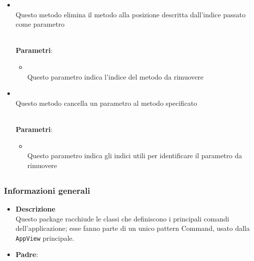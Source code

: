 \begin{itemize}
\begin{itemize}
\begin{itemize}
\end{itemize}
\item {}
\\ Questo metodo elimina il metodo alla posizione descritta dall'indice passato come parametro

\\ \textbf{Parametri}:
\begin{itemize}
\item {}
\\ Questo parametro indica l'indice del metodo da rimuovere

\end{itemize}
\item {}
\\ Questo metodo cancella un parametro al metodo specificato

\\ \textbf{Parametri}:
\begin{itemize}
\item {}
\\ Questo parametro indica gli indici utili per identificare il parametro da rimuovere

\end{itemize}
\end{itemize}
\end{itemize}
\subsection{}
\label{\nogloxy{swedesigner::client::model::utility}}
\subsubsection{Informazioni generali}
\begin{itemize}
\item \textbf{Descrizione}\\
Questo package racchiude le classi che definiscono i principali comandi dell'applicazione; esse fanno parte di un unico pattern Command, usato dalla \texttt{AppView} principale.
\item \textbf{Padre}: \hyperref[\nogloxy{swedesigner::client::model}]{}
\end{itemize}
